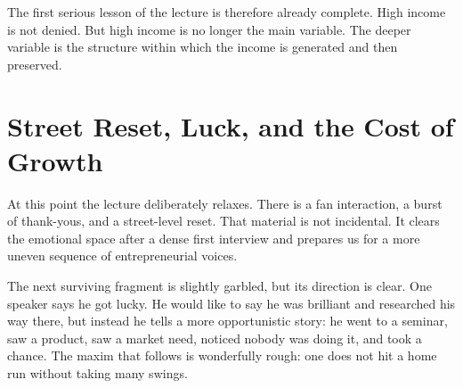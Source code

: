 \begin{figure}
\centering
{}
\end{figure}

The first serious lesson of the lecture is therefore already complete. High income is not denied. But high income is no longer the main variable. The deeper variable is the structure within which the income is generated and then preserved.

\section{Street Reset, Luck, and the Cost of Growth}

At this point the lecture deliberately relaxes. There is a fan interaction, a burst of thank-yous, and a street-level reset. That material is not incidental. It clears the emotional space after a dense first interview and prepares us for a more uneven sequence of entrepreneurial voices.

The next surviving fragment is slightly garbled, but its direction is clear. One speaker says he got lucky. He would like to say he was brilliant and researched his way there, but instead he tells a more opportunistic story: he went to a seminar, saw a product, saw a market need, noticed nobody was doing it, and took a chance. The maxim that follows is wonderfully rough: one does not hit a home run without taking many swings.

